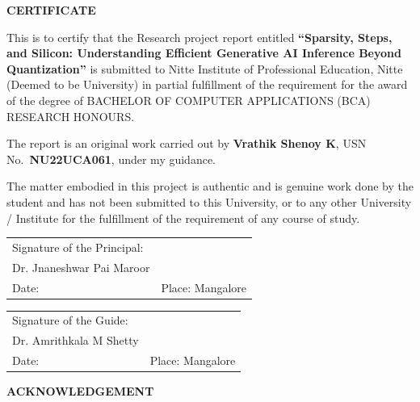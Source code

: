 \documentclass[12pt, a4paper]{report}
\begin{document}
\clearpage
\thispagestyle{plain}
\setcounter{page}{1}

\begin{center}
  {\Large\bfseries CERTIFICATE}
\end{center}
\vspace{14pt}

This is to certify that the Research project report entitled \textbf{``Sparsity, Steps, and Silicon: Understanding Efficient Generative AI Inference Beyond Quantization''} is submitted to Nitte Institute of Professional Education, Nitte (Deemed to be University) in partial fulfillment of the requirement for the award of the degree of BACHELOR OF COMPUTER APPLICATIONS (BCA) RESEARCH HONOURS.

The report is an original work carried out by \textbf{Vrathik Shenoy K}, USN No.\ \textbf{NU22UCA061}, under my guidance.

The matter embodied in this project is authentic and is genuine work done by the student and has not been submitted to this University, or to any other University / Institute for the fulfillment of the requirement of any course of study.

\vspace{36pt}
\noindent
\begin{tabular}{@{}p{}p{}@{}}
  Signature of the Principal: & \\[24pt]
  Dr. Jnaneshwar Pai Maroor & \\[8pt]
  Date: & Place: Mangalore \\
\end{tabular}

\vspace{36pt}
\noindent
\begin{tabular}{@{}p{}p{}@{}}
  Signature of the Guide: & \\[24pt]
  Dr. Amrithkala M Shetty & \\[8pt]
  Date: & Place: Mangalore \\
\end{tabular}

\clearpage
\begin{center}
  {\Large\bfseries ACKNOWLEDGEMENT}
\end{center}
\vspace{14pt}
\end{document}
